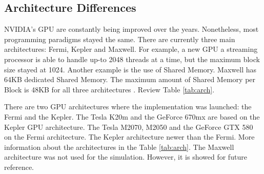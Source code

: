 \subsection{Architecture Differences}

  NVIDIA's GPU are constantly being improved over the years. Nonetheless, most programming paradigms stayed the same. There are currently three main architectures: Fermi, Kepler and Maxwell. For example, a new GPU a streaming processor is able to handle up-to 2048 threads at a time, but the maximum block size stayed at 1024. Another example is the use of Shared Memory. Maxwell has 64KB dedicated Shared Memory. The maximum amount of Shared Memory per Block is 48KB for all three architectures  \cite{hoermanngpu}. Review Table \ref{tab:arch}.
   
  There are two GPU architectures where the implementation was launched: the Fermi and the Kepler. The Tesla K20m and the GeForce 670mx are based on the Kepler GPU architecture. The Tesla M2070, M2050 and the GeForce GTX 580 on the Fermi architecture. The Kepler architecture newer than the Fermi. More information about the architectures in the Table \ref{tab:arch}. The Maxwell architecture was not used for the simulation. However, it is showed for future reference.
  
